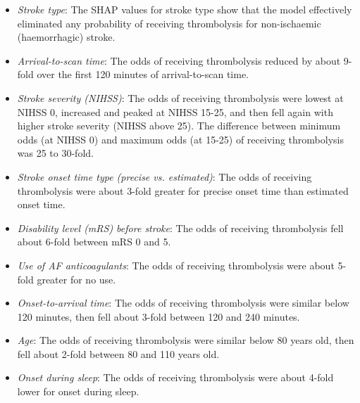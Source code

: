 \begin{itemize}
    \item \emph{Stroke type}: The SHAP values for stroke type show that the model effectively eliminated any probability of receiving thrombolysis for non-ischaemic (haemorrhagic) stroke.
    \item \emph{Arrival-to-scan time}: The odds of receiving thrombolysis reduced by about 9-fold over the first 120 minutes of arrival-to-scan time.
    \item \emph{Stroke severity (NIHSS)}: The odds of receiving thrombolysis were lowest at NIHSS 0, increased and peaked at NIHSS 15-25, and then fell again with higher stroke severity (NIHSS above 25). The difference between minimum odds (at NIHSS 0) and maximum odds (at 15-25) of receiving thrombolysis was 25 to 30-fold.
    \item \emph{Stroke onset time type (precise vs. estimated)}: The odds of receiving thrombolysis were about 3-fold greater for precise onset time than estimated onset time.
    \item \emph{Disability level (mRS) before stroke}: The odds of receiving thrombolysis fell about 6-fold between mRS 0 and 5.
    \item \emph{Use of AF anticoagulants}: The odds of receiving thrombolysis were about 5-fold greater for no use.
    \item \emph{Onset-to-arrival time}: The odds of receiving thrombolysis were similar below 120 minutes, then fell about 3-fold between 120 and 240 minutes.
    \item \emph{Age}: The odds of receiving thrombolysis were similar below 80 years old, then fell about 2-fold between 80 and 110 years old.    
    \item \emph{Onset during sleep}: The odds of receiving thrombolysis were about 4-fold lower for onset during sleep.
\end{itemize}

